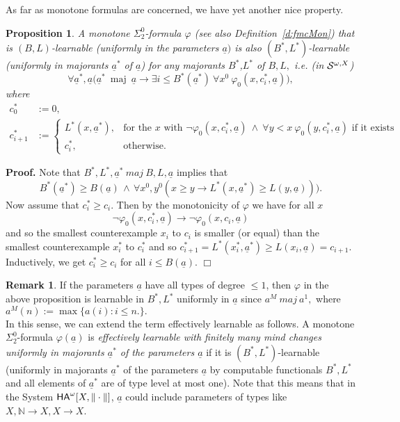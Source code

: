 \documentclass[1p]{elsarticle}
\newcommand{\usftext}[1]{\textsf{\upshape #1}}
\newcommand{\NN}{\ensuremath{\mathbb{N}}}
\DeclareMathOperator{\maj}{maj} %
\newcommand{\ha}{\ensuremath{{\usftext{HA}}^\omega}} %
\newcommand{\tup}{\underline} %
\newcommand{\Telse}{\text{otherwise}}
\theoremstyle{plain}
\newtheorem{prop}[thm]{Proposition}
\theoremstyle{definition}
\newtheorem{rmk}[thm]{Remark}
\theoremstyle{remark}
\renewcommand{\phi}{\varphi}
\theoremstyle{definition}
\begin{document}
As far as monotone formulas are concerned, we have yet another nice property.
\begin{prop}\label{p:majBL}
A monotone $\Sigma^0_2$-formula $\phi$ (see also Definition~\ref{d:fmcMon}) that is $(B,L)$-learnable (uniformly in the parameters $\underline{a})$ 
is also $(B^*,L^*)$-learnable (uniformly in majorants $\tup a^*$ of 
$\tup a$) for any majorants $B^*$,$L^*$ of $B,L,$ i.e. 
(in ${\cal S}^{\omega,X}$)  
\[ \forall 
\underline{a}^*,\underline{a} \big( 
\underline{a}^* \ \maj\ \underline{a}\to 
\exists i\leq B^*(\tup a^*)\ \forall x^0\ \phi_0(x,c^*_i,\tup a)\big),\] where
\begin{align*}
c^*_0&:=0,\\
c^*_{i+1}&:=
\begin{cases}
L^*(x, \tup a^*),&\text{for the $x$ with } \neg\phi_0(x,c^*_i,\tup a)\ \wedge\ \forall y<x\ \phi_0(y,c^*_i,\tup a) \text{ if it exists}\\
c^*_i,&\Telse.
\end{cases}
\end{align*}
\end{prop}
{\bf Proof.} Note that $B^*,L^*,\tup a^* \ maj \ B,L,\tup a$ implies that 
\[ B^*(\underline{a}^*) \ge B(\underline{a}) \,\wedge\,\forall x^0,y^0 
(x\ge y\to L^*(x,\underline{a}^*)\ge L(y,\underline{a}))).\] 
Now assume that $c^*_i\ge c_i.$ Then by the monotonicity of $\varphi$ 
we have for all $x$ 
\[ \neg \varphi_0(x,c^*_i,\underline{a})\rightarrow \neg \varphi_0
(x,c_i,\underline{a}) \] 
and so the smallest counterexample $x_i$ to $c_i$ is smaller (or equal) 
than the smallest counterexample $x^*_i$ to $c^*_i$ and so 
$c^*_{i+1}=L^*(x^*_i,\underline{a}^*) \ge L(x_i,\underline{a})=c_{i+1}.$ 
Inductively, we get $c^*_i\ge c_i$ for all $i\le B(\underline{a}).$ 
\hfill $\Box$  


\begin{rmk} If the parameters $\underline{a}$ have all types of degree 
$\le 1$, then $\varphi$ in the above proposition is learnable in $B^*,L^*$ 
uniformly in $\underline{a}$ since $a^M \ maj \ a^1,$ where 
$a^M(n):=\max\{ a(i):i\le n.\}.$
\\ In this sense, we can extend the term effectively learnable as follows. A monotone $\Sigma^0_2$-formula $\phi(\tup a)$ is 
{\em effectively learnable with finitely many mind changes uniformly in 
majorants $\underline{a}^*$ of the parameters $\underline{a}$} if it is 
$(B^*,L^*)$-learnable (uniformly in majorants $\underline{a}^*$ of the 
parameters $\underline{a}$ by computable functionals $B^*,L^*$ and all elements of $\tup a^*$ are of type level at most one). 
Note that this means that in the System $\ha[X,\|\cdot\|]$, $\tup a$ could include parameters of types like $X,\NN\to X,X\to X$.
\end{rmk}
\end{document}
